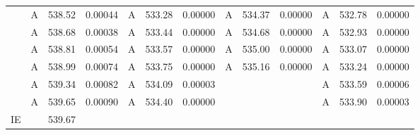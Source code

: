 \documentclass[journal=jctcce,manuscript=article]{achemso}
\begin{document}
\begin{table}
\begin{tabular}{l|lcc|lcc|lcc|lcc}
& A & 538.52 & 0.00044 & A & 533.28 & 0.00000 & A & 534.37 & 0.00000 & A & 532.78 & 0.00000 \\
& A & 538.68 & 0.00038 & A & 533.44 & 0.00000 & A & 534.68 & 0.00000 & A & 532.93 & 0.00000 \\
& A & 538.81 & 0.00054 & A & 533.57 & 0.00000 & A & 535.00 & 0.00000 & A & 533.07 & 0.00000 \\
& A & 538.99 & 0.00074 & A & 533.75 & 0.00000 & A & 535.16 & 0.00000 & A & 533.24 & 0.00000 \\
& A & 539.34 & 0.00082 & A & 534.09 & 0.00003 &  &        &         & A & 533.59 & 0.00006 \\
& A & 539.65 & 0.00090 & A & 534.40 & 0.00000 &  &        &         & A & 533.90 & 0.00003 \\
\hline
IE & & 539.67 & 
   & & & 
   & & & 
   & &   \\
\hline
  \end{tabular}
\end{table}
\end{document}
